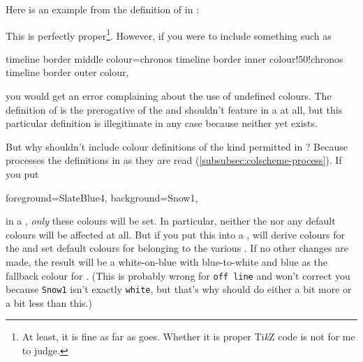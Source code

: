 \documentclass[10pt,british,a4paper]{ltxdoc}
\newcommand*{\cywir}{\marginpar{\raggedleft\mbox{ }\bigskip\par\textcolor{green}{\ding{52}}}}
\newcommand*{\anghywir}{\marginpar{\raggedleft\mbox{ }\bigskip\par\textcolor{red}{\ding{56}~}}}
\newcommand*\pkg[1]{\textpkg{#1}}
\newcommand*\TikZ{Ti\emph{k}Z}
\begin{document}
Here is an example from the definition of  in :
\cywir{}
This is perfectly proper\footnote{%
  At least, it is fine as far as \pkg{chronos} goes. Whether it is proper \TikZ{} code is not for me to judge.}.
However, if you were to include something such as
\anghywir\begin{chronoscode}
  timeline border middle colour=chronos timeline border inner colour!50!chronos timeline border outer colour,
\end{chronoscode}
you would get an error complaining about the use of undefined colours.
The definition of  is the prerogative of the \colschemelabelname{} and shouldn't feature in a \chronosstylelabelname{} at all, but this particular definition is illegitimate in any case because neither  yet exists.

But why shouldn't \chronosstyleslabelname{} include colour definitions of the kind permitted in \colschemeslabelname{}?
Because \pkg{chronos} processes the definitions in \colschemeslabelname{} as they are read (\cref{subsubsec:colscheme-process}).
If you put
\anghywir\begin{chronoscode}
  foreground=SlateBlue4,
  background=Snow1,
\end{chronoscode}
in a \chronosstylelabelname{}, \emph{only} these colours will be set.
In particular, neither the  nor any default colours will be affected at all.
But if you put this into a \colschemelabelname{}, \pkg{chronos} will derive colours for the  and set default colours for \elementslabelname{} belonging to the various \tagslabelname{}.
If no other changes are made, the result will be a white-on-blue  with blue-to-white  and blue as the fallback colour for  \elementslabelname{}.
(This is probably wrong for \texttt{off line} and \pkg{chronos} won't correct you because \texttt{Snow1} isn't exactly \texttt{white}, but that's why \colschemeslabelname{} should do either a bit more or a bit less than this.)
\end{document}
